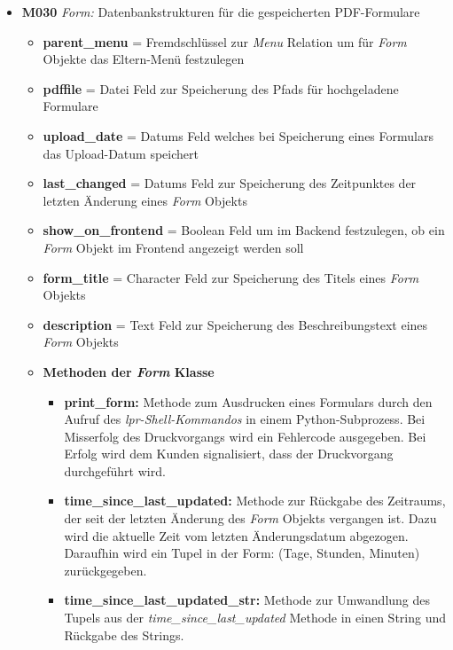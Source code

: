 \begin{itemize}
    \item \textbf{M030} \textit{Form:} Datenbankstrukturen für die gespeicherten PDF-Formulare
    \begin{itemize}
        \item \textbf{parent\_menu} = Fremdschlüssel zur \textit{Menu} Relation um für \textit{Form} Objekte das Eltern-Menü festzulegen
        \item \textbf{pdffile} = Datei Feld zur Speicherung des Pfads für hochgeladene Formulare
        \item \textbf{upload\_date} = Datums Feld welches bei Speicherung eines Formulars das Upload-Datum speichert
        \item \textbf{last\_changed} = Datums Feld zur Speicherung des Zeitpunktes der letzten Änderung eines \textit{Form} Objekts
        \item \textbf{show\_on\_frontend} = Boolean Feld um im Backend festzulegen, ob ein \textit{Form} Objekt im Frontend angezeigt werden soll
        \item \textbf{form\_title} = Character Feld zur Speicherung des Titels eines \textit{Form} Objekts
        \item \textbf{description} = Text Feld zur Speicherung des Beschreibungstext eines \textit{Form} Objekts
    \end{itemize}
    \begin{itemize}
    \newpage
        \item \textbf{Methoden der \textit{Form} Klasse}
        \begin{itemize}
            \item \textbf{print\_form:} Methode zum Ausdrucken eines Formulars durch den Aufruf des \textit{lpr-Shell-Kommandos} in einem Python-Subprozess. Bei Misserfolg des Druckvorgangs wird ein Fehlercode ausgegeben. Bei Erfolg wird dem Kunden signalisiert, dass der Druckvorgang durchgeführt wird.
            \item \textbf{time\_since\_last\_updated:} Methode zur Rückgabe des Zeitraums, der seit der letzten Änderung des \textit{Form} Objekts vergangen ist. Dazu wird die aktuelle Zeit vom letzten Änderungsdatum abgezogen. Daraufhin wird ein Tupel in der Form: (Tage, Stunden, Minuten) zurückgegeben.
            \item \textbf{time\_since\_last\_updated\_str:} Methode zur Umwandlung des Tupels aus der \textit{time\_since\_last\_updated} Methode in einen String und Rückgabe des Strings.
        \end{itemize}
    \end{itemize}
\end{itemize}

